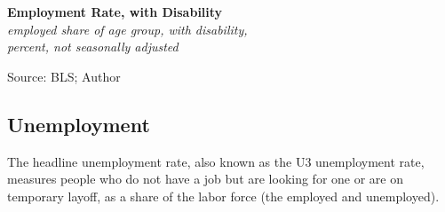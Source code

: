 \documentclass{report}
\makeatletter
\newcommand{\tbllink}[1]{\href{https://raw.githubusercontent.com/bdecon/US-chartbook/master/chartbook/data/#1}{\faTable}}
\newcommand*\short[1]{\expandafter\@gobbletwo\number\numexpr#1\relax}
\newcommand{\absnode}[3]{\node[below right, align=left] at (axis cs: #1,#2) {#3};}
\newcommand{\dateaxisticks}{
		date coordinates in=x, axis line style={draw=none},
		xmax={2024-01-31},
		max space between ticks=40,	    
		xtick={{1990-01-01}, {1992-01-01}, {1994-01-01}, 
			{1996-01-01}, {1998-01-01}, {2000-01-01}, 
			{2002-01-01}, {2004-01-01}, {2006-01-01},
			{2008-01-01}, {2010-01-01}, {2012-01-01}, {2014-01-01},
		    {2016-01-01}, {2018-01-01}, {2020-01-01}, {2022-01-01}, 
		    {2024-01-01}, {2026-01-01}},
		minor xtick={{1989-01-01}, {1991-01-01}, {1993-01-01},
			{1995-01-01}, {1997-01-01}, {1999-01-01}, 
			{2001-01-01}, {2003-01-01}, {2005-01-01}, {2007-01-01},
		    {2009-01-01}, {2011-01-01}, {2013-01-01}, {2015-01-01},
		    {2017-01-01}, {2019-01-01}, {2021-01-01}, {2023-01-01}, 
		    {2025-01-01}, {2027-01-01}},
		enlarge y limits={0.06}, enlarge x limits={0.01},
		xticklabel style={align=center, yshift=-2pt}, tick label style={inner sep=0pt},
		}
\newcommand{\bbar}[2]{extra #1 ticks = {{#2}}, extra #1 tick labels = ,
		extra #1 tick style = {grid=major, grid style={thick, black!25}},}
\newcommand{\stdline}[4]{\addplot[very thick, no markers, color=#1] 
		table [x=#2, y=#3, col sep=comma] {#4};	}
\newcommand{\recbars}{
		\fill[color=black!10] (axis cs:{2007-12-01},\pgfkeysvalueof{/pgfplots/ymin})
			rectangle (axis cs:{2009-07-01}, \pgfkeysvalueof{/pgfplots/ymax});
		\fill[color=black!10] (axis cs:{2020-02-01},\pgfkeysvalueof{/pgfplots/ymin}) 
			rectangle (axis cs:{2020-05-01}, \pgfkeysvalueof{/pgfplots/ymax});}
\makeatother
\begin{document}
{\begin{minipage}{0.38\textwidth} 
\normalsize \textbf{Employment Rate, with Disability}\\
\footnotesize{\textit{employed share of age group, with disability,}}\\
\footnotesize{\textit{percent, not seasonally adjusted}}
\vspace{4.7cm}

\hspace{2mm} 

\footnotesize{Source: BLS; Author} \hfill \tbllink{dis_emp_rate_bls.csv} \ \ \tbllink{dis_emp_rate_cps.csv}
\end{minipage} \hspace{5mm}
\begin{minipage}{0.34\textwidth} 
\small  

 
\end{minipage}
\newpage
\vspace*{-10mm}

\begin{minipage}{1.0\textwidth} 
\subsection*{Unemployment}
\hypertarget{labu}{\label{labu}}
\vspace{-0.5mm}
\small The headline unemployment rate, also known as the U3 unemployment rate, measures people who do not have a job but are looking for one or are on temporary layoff, as a share of the labor force (the employed and unemployed). 
\end{minipage}

}
\end{document}
